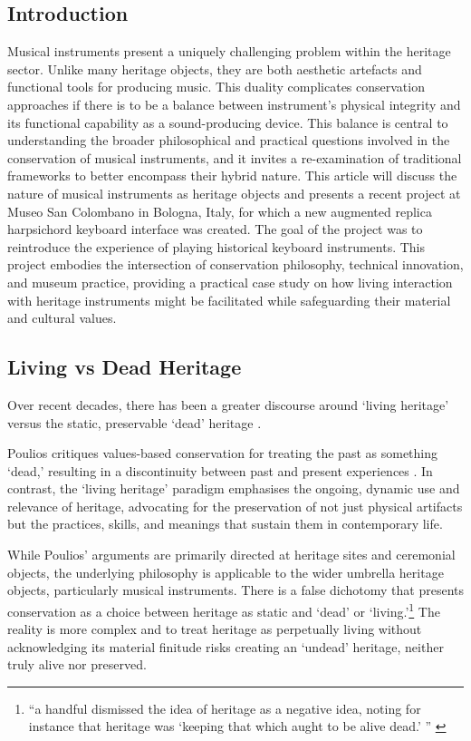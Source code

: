 \subsection{Introduction}

Musical instruments present a uniquely challenging problem within the heritage sector. Unlike many heritage objects, they are both aesthetic artefacts and functional tools for producing music. This duality complicates conservation approaches if there is to be a balance between instrument's physical integrity and its functional capability as a sound-producing device. This balance is central to understanding the broader philosophical and practical questions involved in the conservation of musical instruments, and it invites a re-examination of traditional frameworks to better encompass their hybrid nature. This article will discuss the nature of musical instruments as heritage objects and presents a recent project at Museo San Colombano in Bologna, Italy, for which a new augmented replica harpsichord keyboard interface was created. The goal of the project was to reintroduce the experience of playing historical keyboard instruments. This project embodies the intersection of conservation philosophy, technical innovation, and museum practice, providing a practical case study on how living interaction with heritage instruments might be facilitated while safeguarding their material and cultural values.

\subsection{Living vs Dead Heritage}

Over recent decades, there has been a greater discourse around `living heritage' versus the static, preservable `dead' heritage \cite{poulios_moving_2010,smith_uses_2006}. 

Poulios critiques values-based conservation for treating the past as something `dead,' resulting in a discontinuity between past and present experiences \cite{poulios_moving_2010}. In contrast, the `living heritage' paradigm emphasises the ongoing, dynamic use and relevance of heritage, advocating for the preservation of not just physical artifacts but the practices, skills, and meanings that sustain them in contemporary life.

While Poulios' arguments are primarily directed at heritage sites and ceremonial objects, the underlying philosophy is applicable to the wider umbrella heritage objects, particularly musical instruments. There is a false dichotomy that presents conservation as a choice between heritage as static and `dead' or `living.'\footnote{``a handful dismissed the idea of heritage as a negative idea, noting for instance that heritage was `keeping that which aught to be alive dead.' '' \cite{smith_uses_2006}}
The reality is more complex and to treat heritage as perpetually living without acknowledging its material finitude risks creating an `undead' heritage, neither truly alive nor preserved.

